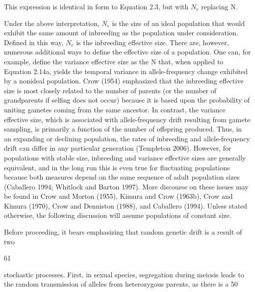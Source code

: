 \documentclass{article}
\begin{document}
This expression is identical in form to Equation 2.3, but with  $ N_{e} $ replacing N.

Under the above interpretation,  $ N_{e} $ is the size of an ideal population that would exhibit the same amount of inbreeding as the population under consideration. Defined in this way,  $ N_{e} $ is the inbreeding effective size. There are, however, numerous additional ways to define the effective size of a population. One can, for example, define the variance effective size as the N that, when applied to Equation 2.14a, yields the temporal variance in allele-frequency change exhibited by a nonideal population. Crow (1954) emphasized that the inbreeding effective size is most closely related to the number of parents (or the number of grandparents if selfing does not occur) because it is based upon the probability of uniting gametes coming from the same ancestor. In contrast, the variance effective size, which is associated with allele-frequency drift resulting from gamete sampling, is primarily a function of the number of offspring produced. Thus, in an expanding or declining population, the rates of inbreeding and allele-frequency drift can differ in any particular generation (Templeton 2006). However, for populations with stable size, inbreeding and variance effective sizes are generally equivalent, and in the long run this is even true for fluctuating populations because both measures depend on the same sequence of adult population sizes (Caballero 1994; Whitlock and Barton 1997). More discourse on these issues may be found in Crow and Morton (1955), Kimura and Crow (1963b), Crow and Kimura (1970), Crow and Denniston (1988), and Caballero (1994). Unless stated otherwise, the following discussion will assume populations of constant size.

Before proceeding, it bears emphasizing that random genetic drift is a result of two

61

stochastic processes. First, in sexual species, segregation during meiosis leads to the random transmission of alleles from heterozygous parents, as there is a 50%
\end{document}
